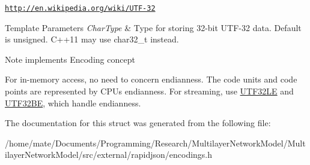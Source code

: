 \href{http://en.wikipedia.org/wiki/UTF-32}{\tt http\+://en.\+wikipedia.\+org/wiki/\+U\+T\+F-\/32} 
\begin{DoxyTemplParams}{Template Parameters}
{\em Char\+Type} & Type for storing 32-\/bit U\+T\+F-\/32 data. Default is unsigned. C++11 may use char32\+\_\+t instead. \\
\hline
\end{DoxyTemplParams}
\begin{DoxyNote}{Note}
implements Encoding concept

For in-\/memory access, no need to concern endianness. The code units and code points are represented by C\+PU\textquotesingle{}s endianness. For streaming, use \hyperlink{structUTF32LE}{U\+T\+F32\+LE} and \hyperlink{structUTF32BE}{U\+T\+F32\+BE}, which handle endianness. 
\end{DoxyNote}


The documentation for this struct was generated from the following file\+:\begin{DoxyCompactItemize}
\item 
/home/mate/\+Documents/\+Programming/\+Research/\+Multilayer\+Network\+Model/\+Multilayer\+Network\+Model/src/external/rapidjson/encodings.\+h\end{DoxyCompactItemize}
